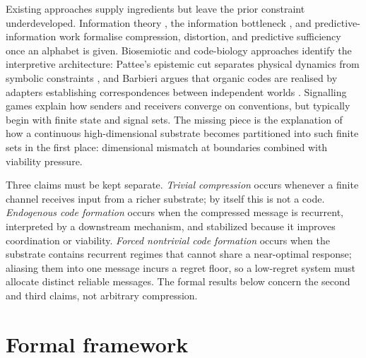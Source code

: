 \documentclass[12pt]{article}
\theoremstyle{definition}
\begin{document}
Existing approaches supply ingredients but leave the prior constraint underdeveloped. Information theory \citep{shannon1948,coverthomas2006,gray1998}, the information bottleneck \citep{tishby1999}, and predictive-information work \citep{bialek2001} formalise compression, distortion, and predictive sufficiency once an alphabet is given. Biosemiotic and code-biology approaches identify the interpretive architecture: Pattee's epistemic cut separates physical dynamics from symbolic constraints \citep{pattee1969,pattee2001}, and Barbieri argues that organic codes are realised by adapters establishing correspondences between independent worlds \citep{barbieri2003,barbieri2015}. Signalling games \citep{lewis1969,skyrms2010} explain how senders and receivers converge on conventions, but typically begin with finite state and signal sets. The missing piece is the explanation of how a continuous high-dimensional substrate becomes partitioned into such finite sets in the first place: dimensional mismatch at boundaries combined with viability pressure.

Three claims must be kept separate. \emph{Trivial compression} occurs whenever a finite channel receives input from a richer substrate; by itself this is not a code. \emph{Endogenous code formation} occurs when the compressed message is recurrent, interpreted by a downstream mechanism, and stabilized because it improves coordination or viability. \emph{Forced nontrivial code formation} occurs when the substrate contains recurrent regimes that cannot share a near-optimal response; aliasing them into one message incurs a regret floor, so a low-regret system must allocate distinct reliable messages. The formal results below concern the second and third claims, not arbitrary compression.

\section{Formal framework}
\label{sec:framework}

\noindent{}
\end{document}
